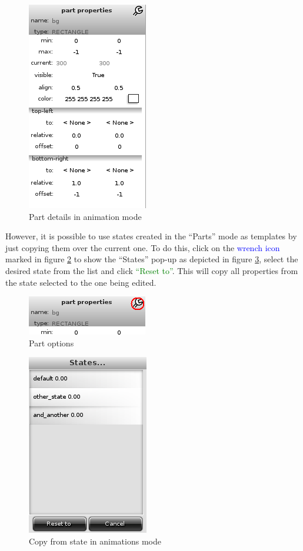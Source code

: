 \documentclass[a4paper]{profusion}
\newcommand{\GUIButton}[1]{\textcolor{green}{#1}} %
\newcommand{\GUIIcon}[1]{\textcolor{blue}{#1}}    %
\begin{document}
\begin{figure}[h!]
  \centering
  \includegraphics{images/animation_part_details.png}
  \caption{Part details in animation mode}
  \label{fig:animation_part_details}
\end{figure}

  However, it is possible to use states created in the ``Parts'' mode
  as templates by just copying them over the current one. To do this,
  click on the \GUIIcon{wrench icon} marked in figure
  \ref{fig:animation_part_options} to show the ``States'' pop-up as
  depicted in figure \ref{fig:animation_states_popup}, select the
  desired state from the list and click \GUIButton{``Reset to''}. This
  will copy all properties from the state selected to the one being
  edited.

\begin{figure}[h!]
  \centering
  \includegraphics{images/animation_part_options.png}
  \caption{Part options}
  \label{fig:animation_part_options}
\end{figure}

\begin{figure}[h!]
  \centering
  \includegraphics{images/animation_states_popup.png}
  \caption{Copy from state in animations mode}
  \label{fig:animation_states_popup}
\end{figure}
\end{document}

